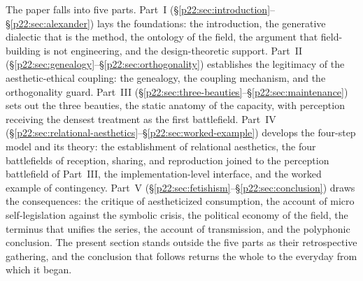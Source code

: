 The paper falls into five parts. Part~I (\S\ref{p22:sec:introduction}--\S\ref{p22:sec:alexander}) lays the foundations: the introduction, the generative dialectic that is the method, the ontology of the field, the argument that field-building is not engineering, and the design-theoretic support. Part~II (\S\ref{p22:sec:genealogy}--\S\ref{p22:sec:orthogonality}) establishes the legitimacy of the aesthetic-ethical coupling: the genealogy, the coupling mechanism, and the orthogonality guard. Part~III (\S\ref{p22:sec:three-beauties}--\S\ref{p22:sec:maintenance}) sets out the three beauties, the static anatomy of the capacity, with perception receiving the densest treatment as the first battlefield. Part~IV (\S\ref{p22:sec:relational-aesthetics}--\S\ref{p22:sec:worked-example}) develops the four-step model and its theory: the establishment of relational aesthetics, the four battlefields of reception, sharing, and reproduction joined to the perception battlefield of Part~III, the implementation-level interface, and the worked example of contingency. Part~V (\S\ref{p22:sec:fetishism}--\S\ref{p22:sec:conclusion}) draws the consequences: the critique of aestheticized consumption, the account of micro self-legislation against the symbolic crisis, the political economy of the field, the terminus that unifies the series, the account of transmission, and the polyphonic conclusion. The present section stands outside the five parts as their retrospective gathering, and the conclusion that follows returns the whole to the everyday from which it began.
